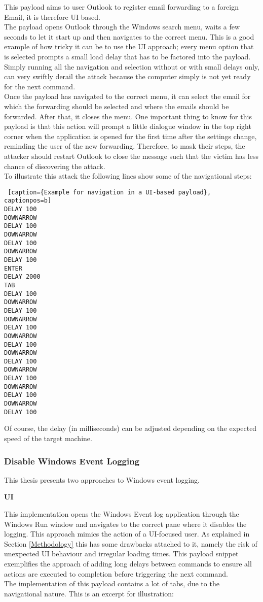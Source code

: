 This payload aims to user Outlook to register email forwarding to a foreign Email, it is therefore UI based. \\
The payload opens Outlook through the Windows search menu, waits a few seconds to let it start up and then navigates to the correct menu. This is a good example of how tricky it can be to use the UI approach; every menu option that is selected prompts a small load delay that has to be factored into the payload. Simply running all the navigation and selection without or with small delays only, can very swiftly derail the attack because the computer simply is not yet ready for the next command. \\
Once the payload has navigated to the correct menu, it can select the email for which the forwarding should be selected and where the emails should be forwarded. After that, it closes the menu. One important thing to know for this payload is that this action will prompt a little dialogue window in the top right corner when the application is opened for the first time after the settings change, reminding the user of the new forwarding. Therefore, to mask their steps, the attacker should restart Outlook to close the message such that the victim has less chance of discovering the attack. \\
To illustrate this attack the following lines show some of the navigational steps:


\begin{lstlisting} [caption={Example for navigation in a UI-based payload}, captionpos=b]
DELAY 100
DOWNARROW
DELAY 100
DOWNARROW
DELAY 100
DOWNARROW
DELAY 100
ENTER
DELAY 2000
TAB
DELAY 100
DOWNARROW
DELAY 100
DOWNARROW
DELAY 100
DOWNARROW
DELAY 100
DOWNARROW
DELAY 100
DOWNARROW
DELAY 100
DOWNARROW
DELAY 100
DOWNARROW
DELAY 100
\end{lstlisting}

Of course, the delay (in milliseconds) can be adjusted depending on the expected speed of the target machine. 





\subsubsection{Disable Windows Event Logging}

This thesis presents two approaches to Windows event logging.

\textbf{UI} 

This implementation opens the Windows Event log application through the Windows Run window and navigates to the correct pane where it disables the logging.
This approach mimics the action of a UI-focused user. As explained in Section \ref{Methodology} this has some drawbacks attached to it, namely the risk of unexpected UI behaviour and irregular loading times. This payload snippet exemplifies the approach of adding long delays between commands to ensure all actions are executed to completion before triggering the next command.\\
The implementation of this payload contains a lot of tabs, due to the navigational nature. This is an excerpt for illustration:

